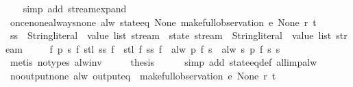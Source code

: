 \begin{isabellebody}
%
\isadelimproof
\ \ %
\endisadelimproof
%
\isatagproof
{}\isamarkupfalse%
\ {\isacharparenleft}simp\ add{\isacharcolon}\ stream{\isachardot}expand{\isacharparenright}%
\endisatagproof
{\isafoldproof}%
%
\isadelimproof
\isanewline
%
\endisadelimproof
\isanewline
{}\isamarkupfalse%
\ once{\isacharunderscore}none{\isacharunderscore}always{\isacharunderscore}none{\isacharcolon}\ {\isachardoublequoteopen}alw\ {\isacharparenleft}state{\isacharunderscore}eq\ None{\isacharparenright}\ {\isacharparenleft}make{\isacharunderscore}full{\isacharunderscore}observation\ e\ None\ r\ t{\isacharparenright}{\isachardoublequoteclose}\isanewline
%
\isadelimproof
%
\endisadelimproof
%
\isatagproof
{}\isamarkupfalse%
\ {\isacharminus}\isanewline
\ \ \isamarkupfalse%
\ ss\ {\isacharcolon}{\isacharcolon}\ {\isachardoublequoteopen}{\isacharparenleft}{\isacharparenleft}String{\isachardot}literal\ {\isasymtimes}\ value\ list{\isacharparenright}\ stream\ {\isasymRightarrow}\ state\ stream{\isacharparenright}\ {\isasymRightarrow}\ {\isacharparenleft}String{\isachardot}literal\ {\isasymtimes}\ value\ list{\isacharparenright}\ stream{\isachardoublequoteclose}\ \isanewline
\ \ \ \ {\isachardoublequoteopen}{\isasymforall}f\ p\ s{\isachardot}\ f\ {\isacharparenleft}stl\ {\isacharparenleft}ss\ f{\isacharparenright}{\isacharparenright}\ {\isasymnoteq}\ stl\ {\isacharparenleft}f\ {\isacharparenleft}ss\ f{\isacharparenright}{\isacharparenright}\ {\isasymor}\ alw\ p\ {\isacharparenleft}f\ s{\isacharparenright}\ {\isacharequal}\ alw\ {\isacharparenleft}{\isasymlambda}s{\isachardot}\ p\ {\isacharparenleft}f\ s{\isacharparenright}{\isacharparenright}\ s{\isachardoublequoteclose}\isanewline
\ \ \ \ \isamarkupfalse%
\ {\isacharparenleft}metis\ {\isacharparenleft}no{\isacharunderscore}types{\isacharparenright}\ alw{\isacharunderscore}inv{\isacharparenright}\isanewline
\ \ \isamarkupfalse%
\ \isamarkupfalse%
\ {\isacharquery}thesis\isanewline
\ \ \ \ \isamarkupfalse%
\ {\isacharparenleft}simp\ add{\isacharcolon}\ state{\isacharunderscore}eq{\isacharunderscore}def\ all{\isacharunderscore}imp{\isacharunderscore}alw{\isacharparenright}\isanewline
{}\isamarkupfalse%
%
\endisatagproof
{\isafoldproof}%
%
\isadelimproof
\isanewline
%
\endisadelimproof
\isanewline
{}\isamarkupfalse%
\ no{\isacharunderscore}output{\isacharunderscore}none{\isacharcolon}\ {\isachardoublequoteopen}alw\ {\isacharparenleft}output{\isacharunderscore}eq\ {\isacharbrackleft}{\isacharbrackright}{\isacharparenright}\ {\isacharparenleft}make{\isacharunderscore}full{\isacharunderscore}observation\ e\ None\ r\ t{\isacharparenright}{\isachardoublequoteclose}\isanewline

\end{isabellebody}
